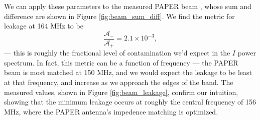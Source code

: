We can apply these parameters to the measured PAPER beam \cite{Pober2012}, whose sum and difference
are shown in Figure \ref{fig:beam_sum_diff}. We find the metric for
leakage at 164 MHz to be
\begin{equation}
  \frac{\mathcal{A}_-}{\mathcal{A}_+} = 2.1\times10^{-3},
\end{equation}
--- this is roughly the fractional level of contamination we'd expect in the $I$ power spectrum. In
fact, this metric can be a function of frequency --- the PAPER beam is most matched at 150 MHz, and
we would expect the leakage to be least at that frequency, and increase as we approach the edges of
the band. The measured values, shown in Figure \ref{fig:beam_leakage}, confirm our intuition,
showing that the minimum leakage occurs at roughly the central frequency of 156 MHz, where the PAPER
antenna's impedence matching is optimized.
